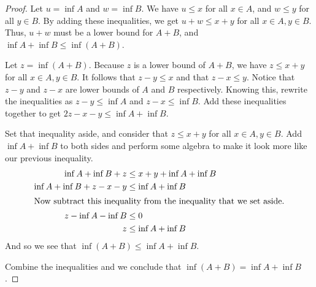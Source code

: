 \documentclass[12pt]{article}
\begin{document}
\begin{proof}
Let $u = \inf A$ and $w = \inf B$. We have $u \leq x$ for all $x \in A$, and $w \leq y$ for all $y \in B$. By adding these inequalities, we get $u + w \leq x + y$ for all $x \in A, y \in B$. Thus, $u + w$ must be a lower bound for $A + B$, and $\inf A + \inf B \leq \inf\left(A + B\right)$.

Let $z = \inf\left(A + B\right)$. Because $z$ is a lower bound of $A + B$, we have $z \leq x + y$ for all $x \in A, y \in B$. It follows that $z - y \leq x$ and that $z - x \leq y$. Notice that $z - y$ and $z - x$ are lower bounds of $A$ and $B$ respectively. Knowing this, rewrite the inequalities as $z - y \leq \inf A$ and $z - x \leq \inf B$. Add these inequalities together to get $2 z - x - y \leq \inf A + \inf B$.

Set that inequality aside, and consider that $z \leq x + y$ for all $x \in A, y \in B$. Add $\inf A + \inf B$ to both sides and perform some algebra to make it look more like our previous inequality.
\begin{align*}
\inf A + \inf B + z &\leq x + y + \inf A + \inf B\\
\inf A + \inf B + z - x - y &\leq \inf A + \inf B\\
\intertext{Now subtract this inequality from the inequality that we set aside.}
z - \inf A - \inf B &\leq 0\\
z &\leq \inf A + \inf B
\end{align*}
And so we see that $\inf\left(A + B\right) \leq \inf A + \inf B$.

Combine the inequalities and we conclude that $\inf\left(A + B\right) = \inf A + \inf B$.
\end{proof}
\end{document}
